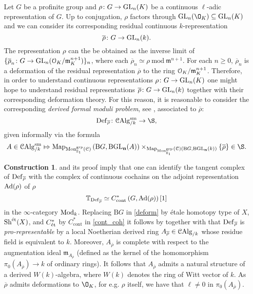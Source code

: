 \documentclass[10pt,a4paper]{amsart}
\numberwithin{equation}{subsection}
\theoremstyle{plain}
\theoremstyle{definition}
\newtheorem{construction}[theorem]{Construction}
\theoremstyle{remark}
\numberwithin{equation}{section}
\begin{document}
Let $G$ be a profinite group and $\rho \colon G \to \mathrm{GL}_n(K)$ be a continuous $\ell$-adic representation of $G$. Up to conjugation, $\rho$ factors through $\GLn(\O_K ) \subseteq \GLn(K)$ and we can consider its corresponding
residual continuous $k$-representation
	\[
		\overline{\rho} \colon G \to \mathrm{GL}_n(k).
	\]
The representation $\rho$ can the be obtained as the inverse limit of $\{ \overline{\rho}_n \colon G \to \mathrm{GL}_n(\mathcal{O}_K / \mathfrak{m}_K^{n+1}) \}_n$, where each $\overline{\rho}_n \simeq \rho \ \mathrm{mod } \ \mathfrak{m}^{n+1}$. For each $n \geq 0$,
$\overline{\rho}_n $ is a deformation of the residual representation $\overline{\rho}$ to the ring $\mathcal{O}_K / \mathfrak m_K^{n+1}$.
Therefore, in order to understand continuous representations $\rho \colon G \to \mathrm{GL}_n(K)$ one might hope to understand residual representations $\overline{\rho} \colon G \to \mathrm{GL}_n(k)$ together with their corresponding
deformation theory. For this reason,
it is reasonable to consider the corresponding \emph{derived formal moduli problem}, see \cite[Definition 12.1.3.1]{lurieSAG}, associated to $\overline{\rho}$:
	\[
		\Def_{\overline{\rho}} \colon \CAlg^{\sm}_{/ k} \to \S,
	\]
given informally via the formula
	\begin{equation} \label{deform}
		A \in \CAlg^{\sm}_{/ k} \Mapsto \Map_{\Mon^{\grp}_{\mathbb E_1} \left( \cC \right)} 	 \left( \mathrm B G, \mathbf{ \mathrm B \GLn}(A) \right) \times_{ \Map_{\Mon^{\grp}_{\mathbb E_1}}(\cC)  \left( \mathrm B G,
		\mathbf{ \mathrm B \GLn} (k) \right) } \{ \overline{\rho} \} \in \S
		.
	\end{equation}


\begin{construction}
\cite[Proposition 4.2.6]{me1} and its proof imply that one can identify the tangent complex of $\mathbf{\mathrm{Def}}_{\overline{\rho}}$ with the complex of continuous cochains on the adjoint representation $\mathrm{Ad}(\rho)$ of $\rho$
	\begin{equation} \label{cont_coh}
		\mathbb T_{\mathbf{\mathrm{Def}}_{\overline{\rho}}} \simeq C^*_{\mathrm{cont}} \left( G, \mathrm{Ad}( \rho ) \right)[1]
	\end{equation}
in the $\infty$-category $\mathrm{Mod}_k$. 
Replacing $\mathrm B G$ in \eqref{deform} by \'etale homotopy type of $X$, $\mathrm{Sh}^{\text{\'et}}(X)$, and $C^*_{\text{\'et}}$ by $C^*_{\mathrm{cont}}$ in \eqref{cont_coh} it follows by \cite[Theorem 19.1]{milne_et} together with \cite[Theorem 6.2.5]{lurieDAGXII} that $
\mathbf{\mathrm{Def}}_{\overline{\rho}}$ is \emph{pro-representable} by
a local Noetherian derived ring $A_{\overline{\rho}} \in \mathcal{C}\mathrm{Alg}_{/ k}$ whose residue field is equivalent to $k$. Moreover, $A_{\overline{\rho}}$ is complete with respect to the augmentation ideal $\mathfrak{m}_{A_{\overline{\rho}}}$
(defined as the kernel of the homomorphism $\pi_0 \left(  A_{\overline{\rho}} \right) \to k$ of ordinary rings).
It follows that $A_{\overline{\rho}}$ admits a natural structure of a derived $W(k)$-algebra, where $W(k)$ denotes the ring of Witt vector of $k$.
As $\overline{\rho}$ admits deformations to $\O_K$, for e.g. $\rho$ itself, we have that $\ell \neq 0 $ in $\pi_0(A_{\overline{\rho}})$.
\end{construction}
\end{document}

